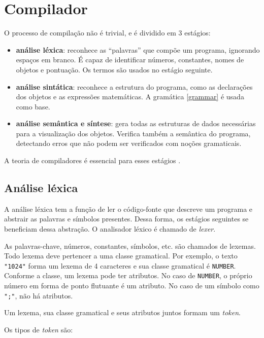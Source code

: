 \chapter{Compilador}
\label{comp}

O processo de compilação não é trivial, e é dividido em 3 estágios:
\begin{itemize}
    \item \textbf{análise léxica}: reconhece as ``palavras'' que compõe um programa,
    ignorando espaços em branco. É capaz de identificar números, 
    constantes, nomes de objetos e pontuação.
    Os termos são usados no estágio seguinte.

    \item \textbf{análise sintática}: reconhece a estrutura do programa, como
    as declarações dos objetos e as expressões matemáticas.
    A gramática \ref{grammar} é usada como base.

    \item \textbf{análise semântica e síntese}: gera todas as estruturas de dados
    necessárias para a visualização dos objetos.
    Verifica também a semântica do programa,
    detectando erros que não podem ser verificados com noções gramaticais.
\end{itemize}

A teoria de compiladores é essencial para esses estágios \cite{Dragon:1}.

\newpage

\section{Análise léxica}
A análise léxica tem a função de ler o código-fonte que descreve um programa
e abstrair as palavras e símbolos presentes.
Dessa forma, os estágios seguintes se beneficiam dessa abstração.
O analisador léxico é chamado de \textit{lexer}.

As palavras-chave, números, constantes, símbolos, etc. são chamados de lexemas.
Todo lexema deve pertencer a uma classe gramatical.
Por exemplo, o texto \texttt{"1024"} forma um lexema de 4 caracteres
e sua classe gramatical é \texttt{NUMBER}.
Conforme a classe, um lexema pode ter atributos.
No caso de \texttt{NUMBER}, o próprio número em forma de ponto flutuante é um atributo.
No caso de um símbolo como \texttt{";"}, não há atributos.

Um lexema, sua classe gramatical e seus atributos juntos formam um \textit{token}.

Os tipos de \textit{token} são:

